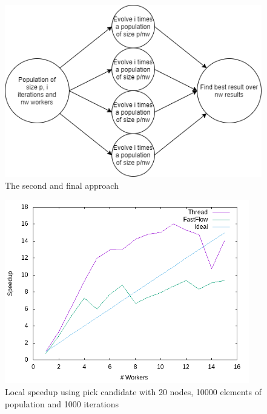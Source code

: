 \documentclass{article}
\begin{document}
    \begin{figure}
        \includegraphics[width=\linewidth]{img/second.png}
        \caption{The second and final approach}
        \label{fig:second}
    \end{figure}

    \begin{figure}
        \includegraphics[width=\linewidth,height=8cm]{img/local_s_pick.png}
        \caption{Local speedup using pick candidate with 20 nodes, 10000 elements of population and 1000 iterations}
        \label{fig:local_speedup}
    \end{figure}
\end{document}
